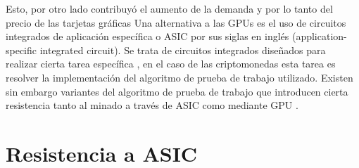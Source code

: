 Esto, por otro lado contribuyó el aumento de la demanda y por lo tanto del precio de las tarjetas gráficas\citep{gpu_price}
Una alternativa a las GPUs es el uso de circuitos integrados de aplicación específica o ASIC por sus siglas en inglés (application-specific integrated circuit). Se trata de circuitos integrados diseñados para realizar cierta tarea específica \citep{asic_def}, en el caso de las criptomonedas esta tarea es resolver la implementación del algoritmo de prueba de trabajo utilizado. Existen sin embargo variantes del algoritmo de prueba de trabajo que introducen cierta resistencia tanto al minado a través de ASIC como mediante GPU \citep{asic_res}.

\section{Resistencia a ASIC} \label{cap3:asic}

